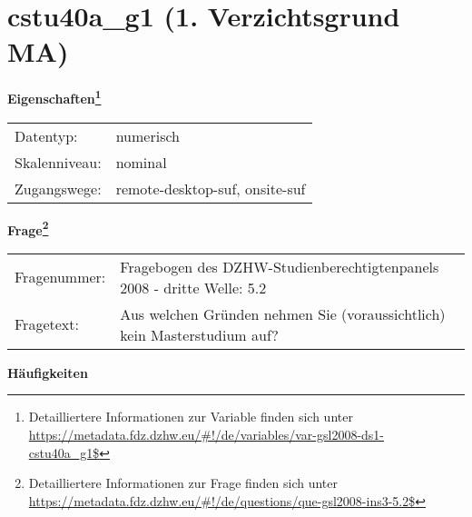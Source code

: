 
    \setcounter{footnote}{0}

    \vspace*{-1.8cm}
	\section{cstu40a\_g1 (1. Verzichtsgrund MA)}
	\label{section:cstu40a_g1}



    \vspace*{0.5cm}
    \noindent\textbf{Eigenschaften\footnote{Detailliertere Informationen zur Variable finden sich unter
		\url{https://metadata.fdz.dzhw.eu/\#!/de/variables/var-gsl2008-ds1-cstu40a_g1$}}}\\
	\begin{tabularx}{\hsize}{@{}lX}
	Datentyp: & numerisch \\
	Skalenniveau: & nominal \\
	Zugangswege: &
	  remote-desktop-suf, 
	  onsite-suf
 \\
    \end{tabularx}



				\vspace*{0.5cm}
                \noindent\textbf{Frage\footnote{Detailliertere Informationen zur Frage finden sich unter
		              \url{https://metadata.fdz.dzhw.eu/\#!/de/questions/que-gsl2008-ins3-5.2$}}}\\
				\begin{tabularx}{\hsize}{@{}lX}
					Fragenummer: &
					  Fragebogen des DZHW-Studienberechtigtenpanels 2008 - dritte Welle:
					  5.2
 \\
					Fragetext: & Aus welchen Gründen nehmen Sie (voraussichtlich) kein Masterstudium auf? \\
				\end{tabularx}





        		\vspace*{0.5cm}
                \noindent\textbf{Häufigkeiten}

